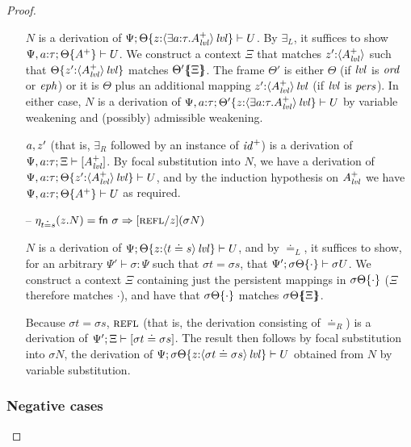 \begin{proof}
\begin{itemize}
$N$ is a derivation of 
$\foc{\Psi}{\tackon{\Theta}{z{:}\islvl{\susp{\exists a{:}\tau. A^+_\mlvl}}}}
  {U}$.
By $\exists_L$, it suffices to show 
$\foc{\Psi, a{:}\tau}{\tackon{\Theta}{A^+}}{U}$.
We construct a context $\Xi$ that matches
$z'{:}\susp{A^+_\mlvl}$ such that
$\tackon{\Theta}{z'{:}\islvl{\susp{A^+_\mlvl}}}$ matches
$\frameoff{\Theta'}{\Xi}$. The frame $\Theta'$ is either $\Theta$
(if $\mlvl$ is $\mtrue$ or $\meph$) or it is $\Theta$ plus 
an additional mapping $z'{:}\islvl{\susp{A^+_\mlvl}}$
(if $\mlvl$ is $\mpers$). In either case,
$N$ is a derivation of 
$\foc{\Psi, a{:}\tau}
  {\tackon{\Theta'}{z{:}\islvl{\susp{\exists a{:}\tau. A^+_\mlvl}}}}
  {U}$ by variable weakening and (possibly) admissible weakening.

\smallskip
$\texistsr{a}{z'}$ (that is, $\exists_R$ followed by 
an instance of ${\it id}^+$) is a derivation of 
$\foc{\Psi, a{:}\tau}{\Xi}{[A^+_\mlvl]}$. By focal 
substitution into $N$, we have a derivation of 
$\foc{\Psi, a{:}\tau}{\tackon{\Theta}{z'{:}\islvl{\susp{A^+_\mlvl}}}}{U}$,
and by the induction hypothesis on $A^+_\mlvl$ we have
$\foc{\Psi, a{:}\tau}{\tackon{\Theta}{A^+}}{U}$ as required.

\smallskip

\item[--] $\etapa{z}{N}{t \doteq s} 
           = {\sf fn}~ \sigma \Rightarrow [\tunifr/z](\sigma{N})$
\smallskip

$N$ is a derivation of $\foc{\Psi}{\tackon{\Theta}{z{:}\islvl{\susp{t
        \doteq s}}}}{U}$, and by $\doteq_L$, it suffices to show, for
an arbitrary $\Psi' \vdash \sigma : \Psi$ such that $\sigma{t} =
\sigma{s}$, that
$\foc{\Psi'}{\tackon{\sigma\Theta}{\cdot}}{\sigma{U}}$.  We construct
a context $\Xi$ containing just the persistent mappings in
$\tackon{\sigma\Theta}{\cdot}$ ($\Xi$ therefore matches $\cdot$), and
have that $\tackon{\sigma\Theta}{\cdot}$ matches
$\frameoff{\sigma\Theta}{\Xi}$.

Because $\sigma{t} = \sigma{s}$, $\tunifr$ (that is, the derivation
consisting of ${\doteq}_R$) is a derivation of
$\foc{\Psi'}{\Xi}{[\sigma{t} \doteq \sigma{s}]}$.  The result then
follows by focal substitution into $\sigma{N}$, the derivation of
$\foc{\Psi}{\tackon{\sigma\Theta}{z{:}\islvl{\susp{\sigma{t} \doteq
        \sigma{s}}}}}{U}$ obtained from $N$ by variable substitution.

\end{itemize}

\subsubsection{Negative cases}


\end{proof}
